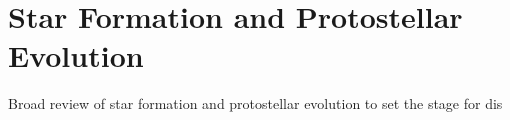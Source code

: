 \section{Star Formation and Protostellar Evolution}
Broad review of star formation and protostellar evolution to set the stage for dis